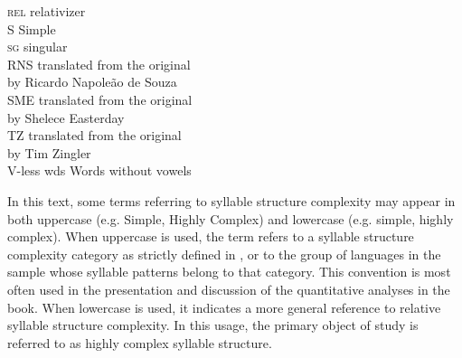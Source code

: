 \begin{multicols}{2}
\begin{tabbing}
\textsc{rel}      \> relativizer\\
S                 \> Simple\\
\textsc{sg}       \> singular\\
RNS      \> translated from the original\\ \> by Ricardo Napoleão de Souza\\
SME      \> translated from the original\\ \> by Shelece Easterday\\
TZ      \> translated from the original\\ \> by Tim Zingler\\
V-less wds       \> Words without vowels
\end{tabbing}
\end{multicols}

\noindent In this text, some terms referring to syllable structure complexity may appear in both uppercase (e.g. Simple, Highly Complex) and lowercase (e.g. simple, highly complex). When uppercase is used, the term refers to a syllable structure complexity category as strictly defined in , or to the group of languages in the sample whose syllable patterns belong to that category. This convention is most often used in the presentation and discussion of the quantitative analyses in the book. When lowercase is used, it indicates a more general reference to relative syllable structure complexity. In this usage, the primary object of study is referred to as highly complex syllable structure.

